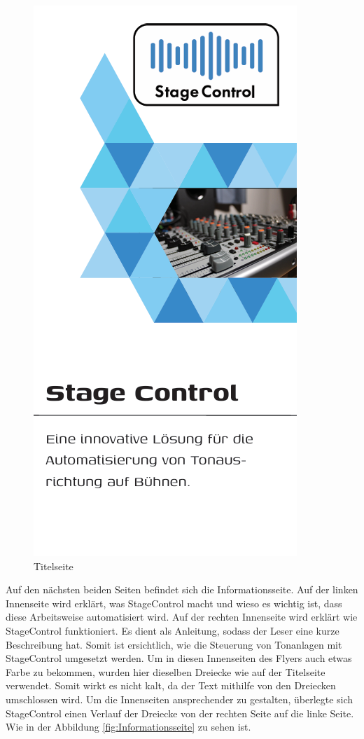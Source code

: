 \begin{figure}[H]
	\centering
	\includegraphics[width=0.5\linewidth]{images/Titelseite.png}
	\caption[Titelseite]{Titelseite}
	\label{fig:Titelseite}
\end{figure}

Auf den nächsten beiden Seiten befindet sich die Informationsseite. Auf der linken Innenseite wird erklärt, was StageControl macht und wieso es wichtig ist, dass diese Arbeitsweise automatisiert wird. Auf der rechten Innenseite wird erklärt wie StageControl funktioniert. Es dient als Anleitung, sodass der Leser eine kurze Beschreibung hat. Somit ist ersichtlich, wie die Steuerung von Tonanlagen mit StageControl umgesetzt werden. Um in diesen Innenseiten des Flyers auch etwas Farbe zu bekommen, wurden hier dieselben Dreiecke wie auf der Titelseite verwendet. Somit wirkt es nicht kalt, da der Text mithilfe von den Dreiecken umschlossen wird. Um die Innenseiten ansprechender zu gestalten, überlegte sich StageControl einen Verlauf der Dreiecke von der rechten Seite auf die linke Seite. Wie in der Abbildung \ref{fig:Informationsseite} zu sehen ist.


